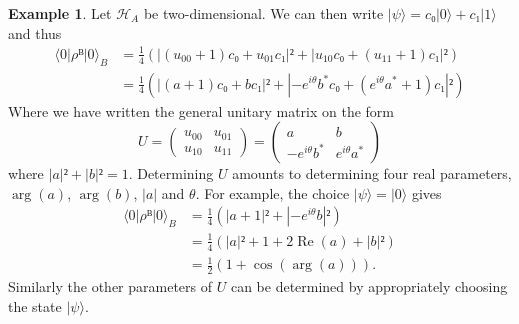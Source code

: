 \documentclass[a4paper,10pt,oneside]{book}
\theoremstyle{plain}
\theoremstyle{definition}
\newtheorem{example}{Example}[section]
\theoremstyle{remark}
\begin{document}
\begin{example}
  Let $\mathcal{H}_A$ be two-dimensional. We can then write $|ψ⟩ = c₀|0⟩ + c₁|1⟩$ and thus
  \begin{equation}
    \begin{aligned}
      ⟨0|ρᴮ|0⟩_B
      &= \frac{1}{4} \left( |(u_{00}+1)c₀ + u_{01}c₁|² + |u_{10}c₀ + (u_{11}+1)c₁|² \right) \\
      &= \frac{1}{4} \left( |(a+1)c₀ + bc₁|² + |-e^{iθ}b^*c₀ + (e^{iθ}a^*+1)c₁|² \right)
    \end{aligned}
  \end{equation}
  Where we have written the general unitary matrix on the form
  \begin{equation}
    U =
    \begin{pmatrix}
      u_{00} & u_{01} \\
      u_{10} & u_{11}
    \end{pmatrix}
    =
    \begin{pmatrix}
      a & b \\
      -e^{iθ}b^* & e^{iθ}a^*
    \end{pmatrix}
  \end{equation}
  where $|a|² + |b|² = 1$. Determining $U$ amounts to determining four real parameters, $\operatorname{arg}(a)$, $\operatorname{arg}(b)$, $|a|$ and $θ$. For example, the choice $|ψ⟩= |0⟩$ gives
  \begin{equation}
    \begin{aligned}
      ⟨0|ρᴮ|0⟩_B
      &= \frac{1}{4} \left( |a+1|² + |-e^{iθ}b|² \right) \\
      &= \frac{1}{4} \left( |a|² + 1 + 2\operatorname{Re}(a) + |b|² \right) \\
      &= \frac{1}{2} \left( 1 + \cos(\operatorname{arg}(a)) \right).
    \end{aligned}
  \end{equation}
  Similarly the other parameters of $U$ can be determined by appropriately choosing the state $|ψ⟩$.
\end{example}
\end{document}
